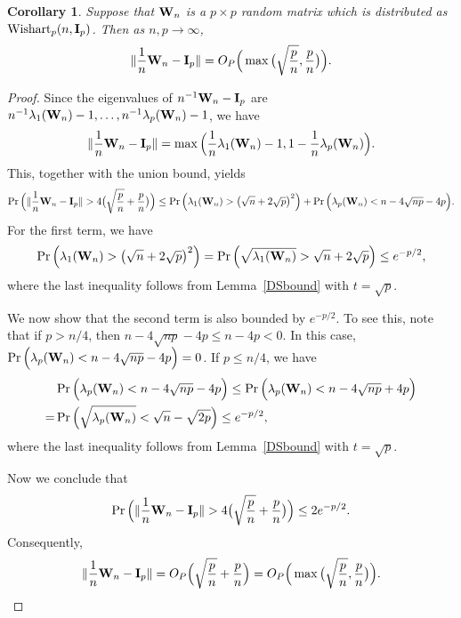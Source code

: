 \documentclass[3p]{elsarticle}
\theoremstyle{plain}
\newtheorem{corollary}{\quad\quad Corollary}
\theoremstyle{definition}
\theoremstyle{remark}
\begin{document}
\begin{appendices}
\begin{corollary}\label{corNorm}
Suppose that $\mathbf{W}_n$ is a $p \times p$ random matrix which is distributed as $\mathrm{Wishart}_p(n,\mathbf{I}_{p})$.
    Then as $n,p\to \infty$,
$$
    \|\frac{1}{n}\mathbf{W}_n-\mathbf{I}_p\|=O_P\Big(\max\big(\sqrt{\frac{p}{n}},\frac{p}{n}\big)\Big).
$$
\end{corollary}
\begin{proof}
    Since the eigenvalues of $n^{-1}\mathbf{W}_n-\mathbf{I}_p$ are $n^{-1}\lambda_1(\mathbf{W}_n)-1,\ldots, n^{-1}\lambda_p(\mathbf{W}_n)-1$, we have
     $$\|\frac{1}{n}\mathbf{W}_n-\mathbf{I}_p\|=\max\Big(\frac{1}{n}\lambda_1(\mathbf{W}_n)-1,1-\frac{1}{n}\lambda_p(\mathbf{W}_n)\Big).$$
This, together with the union bound, yields
$$
    \Pr\Big(\|\frac{1}{n}\BW_n-\BI_p\|>4\big(\sqrt{\frac{p}{n}}+\frac{p}{n}\big)\Big)
    \leq
    \Pr\Big(\lambda_1(\BW_n)>\big(\sqrt{n}+2\sqrt{p}\big)^2\Big)+
    \Pr\Big(\lambda_p(\BW_n)<n-4\sqrt{np}-4p\Big).
$$
    For the first term, we have    $$
    \Pr\Big(\lambda_1(\mathbf{W}_n)>\big(\sqrt{n}+2\sqrt{p}\big)^2\Big)=
    \Pr\Big(\sqrt{\lambda_1(\mathbf{W}_n)}>\sqrt{n}+2\sqrt{p}\Big)\leq e^{-p/2},
    $$
 where the last inequality follows from Lemma~\ref{DSbound} with $t=\sqrt{p}$.

    We now show that the second term is also bounded by $e^{-p/2}$.
    To see this, note that if $p>n/4$, then $n-4\sqrt{np}-4p\leq n-4p<0$.
    In this case, $\Pr\Big(\lambda_p(\mathbf{W}_n)<n-4\sqrt{np}-4p\Big)=0$.
    If $p\leq n/4$, we have
    $$
    \begin{aligned}
        &\Pr\Big(\lambda_p(\mathbf{W}_n)<n-4\sqrt{np}-4p\Big)
    \leq
    \Pr\Big(\lambda_p(\mathbf{W}_n)<n-4\sqrt{np}+4p\Big)\\
        =&
    \Pr\Big(\sqrt{\lambda_p(\mathbf{W}_n)}<\sqrt{n}-\sqrt{2p}\Big)
        \leq e^{-p/2},
    \end{aligned}
    $$
    where the last inequality follows from Lemma~\ref{DSbound} with $t=\sqrt{p}$.

    Now we conclude that
    $$
    \Pr\Big(\|\frac{1}{n}\BW_n-\BI_p\|>4\big(\sqrt{\frac{p}{n}}+\frac{p}{n}\big)\Big)
    \leq 2 e^{-p/2}.
    $$
    Consequently,
    $$\|\frac{1}{n}\mathbf{W}_n-\mathbf{I}_p\|=O_P\Big(\sqrt{\frac{p}{n}}+\frac{p}{n}\Big)=O_P\Big(\max\big(\sqrt{\frac{p}{n}},\frac{p}{n}\big)\Big).$$
\end{proof}




\end{appendices}
\end{document}
